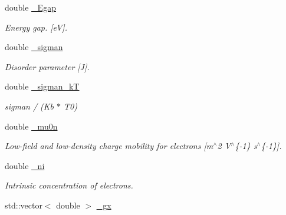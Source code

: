 \begin{DoxyCompactItemize}
\mbox{\label{class_probl_a4050fa19ae8724f4f0acb0f2cc31ef39}} 
double \mbox{\hyperlink{class_probl_a4050fa19ae8724f4f0acb0f2cc31ef39}{\+\_\+\+Egap}}
\begin{DoxyCompactList}\small\item\em Energy gap. \mbox{[}eV\mbox{]}. \end{DoxyCompactList}\item 
\mbox{\label{class_probl_a8d4d09fda48331be283340d85d3656c8}} 
double \mbox{\hyperlink{class_probl_a8d4d09fda48331be283340d85d3656c8}{\+\_\+sigman}}
\begin{DoxyCompactList}\small\item\em Disorder parameter \mbox{[}J\mbox{]}. \end{DoxyCompactList}\item 
\mbox{\label{class_probl_a6bc0309fcfce8cabb6703fa69bd49bb1}} 
double \mbox{\hyperlink{class_probl_a6bc0309fcfce8cabb6703fa69bd49bb1}{\+\_\+sigman\+\_\+kT}}
\begin{DoxyCompactList}\small\item\em sigman / (Kb $\ast$ T0) \end{DoxyCompactList}\item 
\mbox{\label{class_probl_afcdceba73c92492bea0c8c5fb13831c3}} 
double \mbox{\hyperlink{class_probl_afcdceba73c92492bea0c8c5fb13831c3}{\+\_\+mu0n}}
\begin{DoxyCompactList}\small\item\em Low-\/field and low-\/density charge mobility for electrons \mbox{[}m$^\wedge$2 V$^\wedge$\{-\/1\} s$^\wedge$\{-\/1\}\mbox{]}. \end{DoxyCompactList}\item 
\mbox{\label{class_probl_ac27d218a09643f35d61ef209a3413ffd}} 
double \mbox{\hyperlink{class_probl_ac27d218a09643f35d61ef209a3413ffd}{\+\_\+ni}}
\begin{DoxyCompactList}\small\item\em Intrinsic concentration of electrons. \end{DoxyCompactList}\item 
\mbox{\label{class_probl_add30fda0d8314c3ee7fa183e732ae9de}} 
std\+::vector$<$ double $>$ \mbox{\hyperlink{class_probl_add30fda0d8314c3ee7fa183e732ae9de}{\+\_\+gx}}

\end{DoxyCompactItemize}
